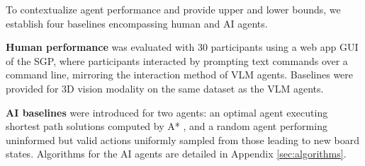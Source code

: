 To contextualize agent performance and provide upper and lower bounds, we establish four baselines encompassing human and AI agents. 

\textbf{Human performance} was evaluated with 30 participants using a web app GUI of the SGP, where participants interacted by prompting text commands over a command line, mirroring the interaction method of VLM agents. Baselines were provided for 3D vision  modality on the same dataset as the VLM agents. 

\textbf{AI baselines} were introduced for two agents: an optimal agent executing shortest path solutions computed by A* \cite{hart1968formal}, and a random agent performing uninformed but valid actions uniformly sampled from those leading to new board states. Algorithms for the AI agents are detailed in Appendix \ref{sec:algorithms}.